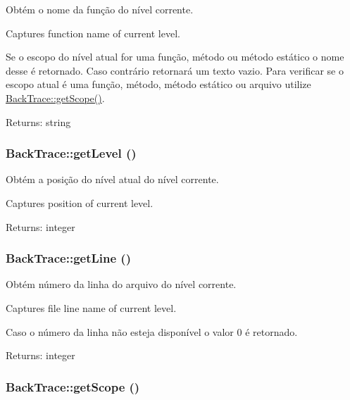 Obtém o nome da função do nível corrente.

Captures function name of current level.

Se o escopo do nível atual for uma função, método ou método estático o nome desse é retornado. Caso contrário retornará um texto vazio. Para verificar se o escopo atual é uma função, método, método estático ou arquivo utilize \hyperlink{class_back_trace_3b1b222bfb41081888742dadf70e2dfb}{BackTrace::getScope()}.

\begin{Desc}
\item[Returns:]string \end{Desc}
\hypertarget{class_back_trace_8d2aa767c2b033c8d2fd957582d761e8}{
\subsubsection[{getLevel}]{\setlength{\rightskip}{0pt plus 5cm}BackTrace::getLevel ()}}
\label{class_back_trace_8d2aa767c2b033c8d2fd957582d761e8}


Obtém a posição do nível atual do nível corrente.

Captures position of current level.

\begin{Desc}
\item[Returns:]integer \end{Desc}
\hypertarget{class_back_trace_43a4681e6cacbba682ae3e189811f3b9}{
\subsubsection[{getLine}]{\setlength{\rightskip}{0pt plus 5cm}BackTrace::getLine ()}}
\label{class_back_trace_43a4681e6cacbba682ae3e189811f3b9}


Obtém número da linha do arquivo do nível corrente.

Captures file line name of current level.

Caso o número da linha não esteja disponível o valor 0 é retornado.

\begin{Desc}
\item[Returns:]integer \end{Desc}
\hypertarget{class_back_trace_3b1b222bfb41081888742dadf70e2dfb}{
\subsubsection[{getScope}]{\setlength{\rightskip}{0pt plus 5cm}BackTrace::getScope ()}}
\label{class_back_trace_3b1b222bfb41081888742dadf70e2dfb}


